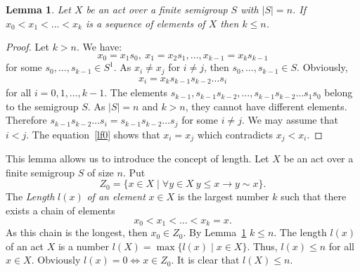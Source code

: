 \documentclass{birkau}
\numberwithin{equation}{section}
\theoremstyle{plain}
\newtheorem{lemma}[theorem]{Lemma}
\theoremstyle{definition}
\begin{document}
	\begin{lemma} \label{lemma:04}
	    Let $X$ be an act over a finite semigroup $S$ with $|S| = n$. If $x_0 < x_1 < \ldots < x_k$ is a sequence of elements of $X$ then $k \leqslant n$.
	\end{lemma}
	\begin{proof}
	    Let $k > n$. We have: $$x_0 = x_1 s_0,\ x_1 = x_2s_1, \ldots , x_{k-1} = x_k s_{k-1}$$ for some $s_0,\ldots,s_{k-1} \in S^1$. As $x_i \neq x_j$ for $i \neq j$, then $ s_0,\ldots,s_{k-1} \in S$. Obviously,
		\begin{gather}
			x_i = x_k s_{k-1} s_{k-2} \ldots s_i \label{lf0}
		\end{gather}
		for all $i = 0,1,\ldots,k-1$. The elements $s_{k-1},s_{k-1}s_{k-2},\ldots,s_{k-1}s_{k-2}\ldots s_1s_0$ belong to the semigroup $S$. As $|S| = n$ and $k>n$, they cannot have different elements. Therefore $s_{k-1}s_{k-2}\ldots s_i = s_{k-1}s_{k-2}\ldots s_j$ for some $i\neq j$. We may assume that $i < j$. The equation~\eqref{lf0} shows that $x_i = x_j$ which contradicts $x_j < x_i$.
	\end{proof}
	
	This lemma allows us to introduce the concept of length. Let $X$ be an act over a finite semigroup $S$ of size $n$. Put $$ Z_0 = \{ x \in X \mid \forall y \in X \ y \leqslant x \rightarrow y \sim x \}.$$ The \textit{Length} $l(x)$ \textit{of an element} $x \in X$ is the largest number $k$ such that there exists a chain of elements $$x_0 < x_1 < \ldots < x_k=x.$$ As this chain is the longest, then $x_0 \in Z_0$. By Lemma~\ref{lemma:04} $k \leqslant n$. The length $l(x)$ of an act $X$ is a number $l(X) = \max \{ l(x) \mid x \in X\}$. Thus, $l(x) \leqslant n$ for all $x \in X$. Obviously $l(x) = 0 \Leftrightarrow x \in Z_0$. It is clear that $l(X) \leqslant n$.
	
\end{document}

